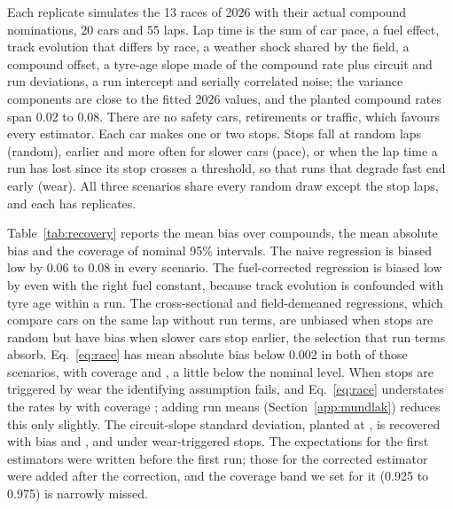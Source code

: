 Each replicate simulates the 13 races of 2026 with their actual compound nominations, 20 cars and 55 laps.
Lap time is the sum of car pace, a fuel effect, track evolution that differs by race, a weather shock shared by the field, a compound offset, a tyre-age slope made of the compound rate plus circuit and run deviations, a run intercept and serially correlated noise; the variance components are close to the fitted 2026 values, and the planted compound rates span 0.02 to 0.08\spl.
There are no safety cars, retirements or traffic, which favours every estimator.
Each car makes one or two stops.
Stops fall at random laps (random), earlier and more often for slower cars (pace), or when the lap time a run has lost since its stop crosses a threshold, so that runs that degrade fast end early (wear).
All three scenarios share every random draw except the stop laps, and each has \RecReps{} replicates.

Table~\ref{tab:recovery} reports the mean bias over compounds, the mean absolute bias and the coverage of nominal 95\% intervals.
The naive regression is biased low by 0.06 to 0.08\spl{} in every scenario.
The fuel-corrected regression is biased low by \RecFuelExoBiasAbs\spl{} even with the right fuel constant, because track evolution is confounded with tyre age within a run.
The cross-sectional and field-demeaned regressions, which compare cars on the same lap without run terms, are unbiased when stops are random but have bias \RecCrossPaceBias\spl{} when slower cars stop earlier, the selection that run terms absorb.
Eq.~\eqref{eq:race} has mean absolute bias below 0.002\spl{} in both of those scenarios, with coverage \RecExactExoCov{} and \RecExactPaceCov, a little below the nominal level.
When stops are triggered by wear the identifying assumption fails, and Eq.~\eqref{eq:race} understates the rates by \RecExactWearBiasAbs\spl{} with coverage \RecExactWearCov; adding run means (Section~\ref{app:mundlak}) reduces this only slightly.
The circuit-slope standard deviation, planted at \RecTrueCircuitSD\spl, is recovered with bias \RecExactExoCircBias{} and \RecExactPaceCircBias\spl, and \RecExactWearCircBias\spl{} under wear-triggered stops.
The expectations for the first estimators were written before the first run; those for the corrected estimator were added after the correction, and the coverage band we set for it (0.925 to 0.975) is narrowly missed.

\begin{table}[t]
\centering\scriptsize\setlength{\tabcolsep}{3pt}

\caption{Recovery of planted compound rates in \RecReps{} simulated seasons per scenario. Bias is the mean over the five compounds of the estimate minus the truth (s/lap), $|$Bias$|$ the mean of the absolute per-compound biases and Cov.\ the mean coverage of nominal 95\% intervals. Stops occur at random laps, earlier for slower cars (pace), or when a run's accumulated loss crosses a threshold (wear).}
\label{tab:recovery}
\end{table}

